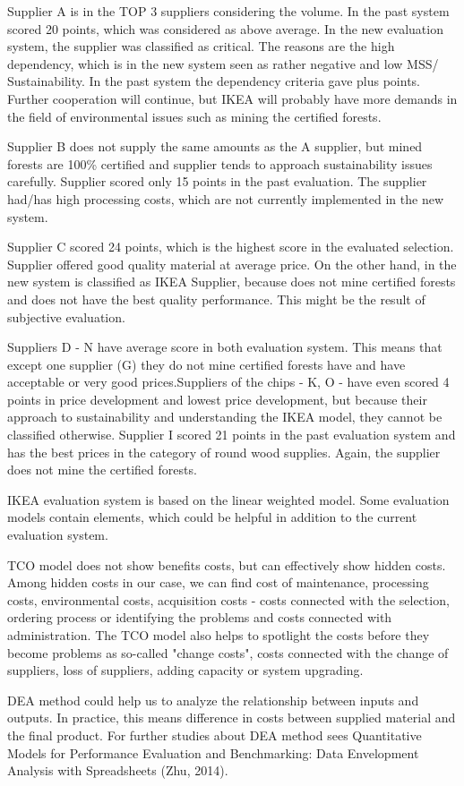 \documentclass[oneside,12pt]{article}%
\begin{document}
\newline
Supplier A is in the TOP 3 suppliers considering the volume. In the past system scored 20 points, which was considered as above average. In the new evaluation system, the supplier was classified as critical. The reasons are the high dependency, which is in the new system seen as rather negative and low MSS/ Sustainability. In the past system the dependency criteria  gave plus points. Further cooperation will continue, but IKEA will probably have more demands in the field of environmental issues such as mining the certified forests. \par
Supplier B does not supply the same amounts as the A supplier, but mined forests are 100\% certified and supplier tends to approach sustainability issues carefully. Supplier scored only 15 points in the past evaluation. The supplier had/has high processing costs, which are not currently implemented in the new system. \par
Supplier C scored 24 points, which is the highest score in the evaluated selection. Supplier offered good quality material at average price. On the other hand, in the new system is classified as IKEA Supplier, because does not mine certified forests and does not have the best quality performance. This might be the result of subjective evaluation.\par
Suppliers D - N have average score in both evaluation system. This means that except one supplier (G) they do not mine certified forests have and have acceptable or very good prices.Suppliers of the chips - K, O -  have even scored 4 points in price development and lowest price development, but because their approach to sustainability and understanding the IKEA model, they cannot be classified otherwise. Supplier I scored 21 points in the past evaluation system and has the best prices in the category of round wood supplies. Again, the supplier does not mine the certified forests.



IKEA evaluation system is based on the linear weighted model. Some evaluation models contain elements, which could be helpful in addition to the current evaluation system. \par
TCO model does not show benefits costs, but can effectively show hidden costs. Among hidden costs in our case, we can find cost of maintenance, processing costs, environmental costs, acquisition costs - costs connected with the selection, ordering process or identifying the problems and costs connected with administration. The TCO model also helps to spotlight the costs before they become problems as so-called  "change costs", costs connected with the change of suppliers, loss of suppliers, adding capacity or system upgrading. \par
DEA method could help us to analyze the relationship between inputs and outputs. In practice, this means difference in costs between supplied material and the final product. For further studies about DEA method sees Quantitative Models for Performance Evaluation and Benchmarking: Data Envelopment Analysis with Spreadsheets (Zhu, 2014).
\end{document}
